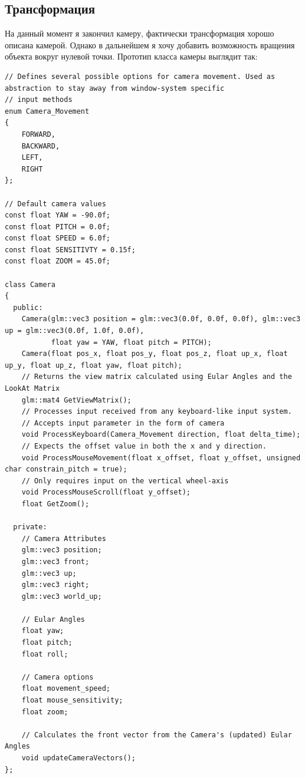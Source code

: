 \documentclass[12pt]{article}
\begin{document}
    \subsection{Трансформация}
    На данный момент я закончил камеру, фактически трансформация хорошо описана
    камерой. Однако в дальнейшем я хочу добавить возможность вращения объекта вокруг
    нулевой точки.
    \noindent
    Прототип класса камеры выглядит так:
    \begin{verbatim}
// Defines several possible options for camera movement. Used as abstraction to stay away from window-system specific
// input methods
enum Camera_Movement
{
    FORWARD,
    BACKWARD,
    LEFT,
    RIGHT
};

// Default camera values
const float YAW = -90.0f;
const float PITCH = 0.0f;
const float SPEED = 6.0f;
const float SENSITIVTY = 0.15f;
const float ZOOM = 45.0f;

class Camera
{
  public:
    Camera(glm::vec3 position = glm::vec3(0.0f, 0.0f, 0.0f), glm::vec3 up = glm::vec3(0.0f, 1.0f, 0.0f),
           float yaw = YAW, float pitch = PITCH);
    Camera(float pos_x, float pos_y, float pos_z, float up_x, float up_y, float up_z, float yaw, float pitch);
    // Returns the view matrix calculated using Eular Angles and the LookAt Matrix
    glm::mat4 GetViewMatrix();
    // Processes input received from any keyboard-like input system. 
    // Accepts input parameter in the form of camera
    void ProcessKeyboard(Camera_Movement direction, float delta_time);
    // Expects the offset value in both the x and y direction.
    void ProcessMouseMovement(float x_offset, float y_offset, unsigned char constrain_pitch = true);
    // Only requires input on the vertical wheel-axis
    void ProcessMouseScroll(float y_offset);
    float GetZoom();

  private:
    // Camera Attributes
    glm::vec3 position;
    glm::vec3 front;
    glm::vec3 up;
    glm::vec3 right;
    glm::vec3 world_up;

    // Eular Angles
    float yaw;
    float pitch;
    float roll;

    // Camera options
    float movement_speed;
    float mouse_sensitivity;
    float zoom;

    // Calculates the front vector from the Camera's (updated) Eular Angles
    void updateCameraVectors();
};
    \end{verbatim}
\end{document}
